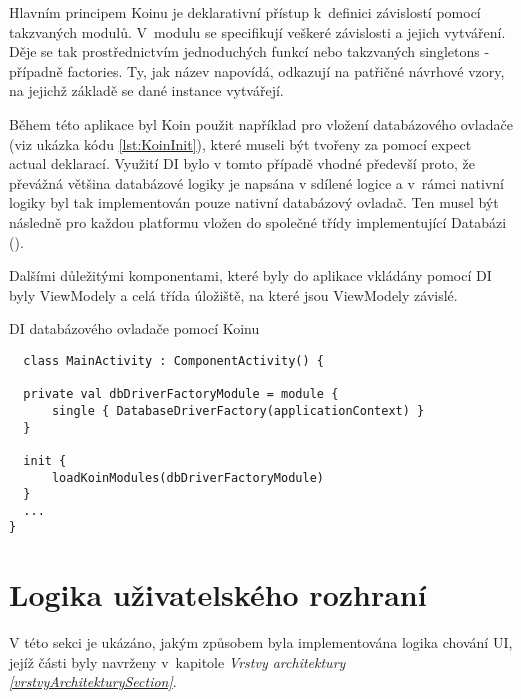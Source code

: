  \medskip

Hlavním principem Koinu je deklarativní přístup k~definici závislostí pomocí takzvaných modulů. V~modulu se specifikují veškeré závislosti a 
jejich vytváření. Děje se tak prostřednictvím jednoduchých funkcí nebo takzvaných singletons - případně factories. Ty, jak název napovídá, odkazují na 
patřičné návrhové vzory, na jejichž základě se dané instance vytvářejí.

\bigskip

Během této aplikace byl Koin použit například pro vložení databázového ovladače (viz ukázka kódu \ref{lst:KoinInit}), které museli být tvořeny za pomocí expect 
actual deklarací.
Využití DI bylo v tomto případě vhodné předevší proto, že převážná většina databázové logiky je napsána v sdílené 
logice a v~rámci nativní logiky byl tak implementován pouze nativní databázový ovladač. Ten musel být následně pro každou platformu vložen do 
společné třídy implementující Databázi ().

Dalšími důležitými komponentami, které byly do aplikace vkládány pomocí DI byly ViewModely a celá třída úložiště, na které jsou ViewModely
závislé.

\begin{listing}[H]
\caption{DI databázového ovladače pomocí Koinu}\label{lst:KoinInit}
\begin{verbatim}
  class MainActivity : ComponentActivity() {

  private val dbDriverFactoryModule = module {
      single { DatabaseDriverFactory(applicationContext) }
  }

  init {
      loadKoinModules(dbDriverFactoryModule)
  }
  ...
}
\end{verbatim}
\end{listing}





\section{Logika uživatelského rozhraní} \label{UILayerImpl}
V této sekci je ukázáno, jakým způsobem byla implementována logika chování UI, jejíž části byly navrženy v~kapitole 
\textit{Vrstvy architektury \ref{vrstvyArchitekturySection}}. 


